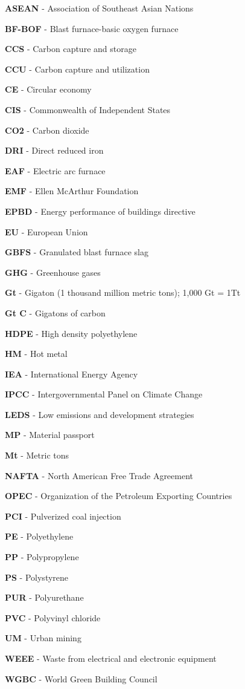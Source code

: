 \begin{scriptsize}
  \begin{myitemize}
  \item[] \textbf{ASEAN} - Association of Southeast Asian Nations
  \item[] \textbf{BF-BOF} - Blast furnace-basic oxygen furnace
  \item[] \textbf{CCS} - Carbon capture and storage
  \item[] \textbf{CCU} - Carbon capture and utilization
  \item[] \textbf{CE} - Circular economy
  \item[] \textbf{CIS} - Commonwealth of Independent States
  \item[] \textbf{CO2} - Carbon dioxide
  \item[] \textbf{DRI} - Direct reduced iron
  \item[] \textbf{EAF} - Electric arc furnace
  \item[] \textbf{EMF} - Ellen McArthur Foundation
  \item[] \textbf{EPBD} - Energy performance of buildings directive
  \item[] \textbf{EU} - European Union
  \item[] \textbf{GBFS} - Granulated blast furnace slag
  \item[] \textbf{GHG} - Greenhouse gases
  \item[] \textbf{Gt} - Gigaton (1 thousand million metric tons); 1,000 Gt = 1Tt
  \item[] \textbf{Gt C} - Gigatons of carbon
  \item[] \textbf{HDPE} - High density polyethylene
  \item[] \textbf{HM} - Hot metal
  \item[] \textbf{IEA} - International Energy Agency
  \item[] \textbf{IPCC} - Intergovernmental Panel on Climate Change
  \item[] \textbf{LEDS} - Low emissions and development strategies
  \item[] \textbf{MP} - Material passport
  \item[] \textbf{Mt} - Metric tons
  \item[] \textbf{NAFTA} - North American Free Trade Agreement
  \item[] \textbf{OPEC} - Organization of the Petroleum Exporting Countries
  \item[] \textbf{PCI} - Pulverized coal injection
  \item[] \textbf{PE} - Polyethylene
  \item[] \textbf{PP} - Polypropylene
  \item[] \textbf{PS} - Polystyrene
  \item[] \textbf{PUR} - Polyurethane
  \item[] \textbf{PVC} - Polyvinyl chloride
  \item[] \textbf{UM} - Urban mining
  \item[] \textbf{WEEE} - Waste from electrical and electronic equipment
  \item[] \textbf{WGBC} - World Green Building Council
  \end{myitemize}
\end{scriptsize}

